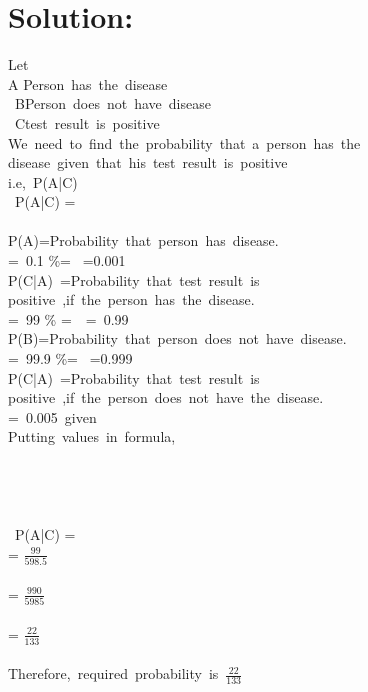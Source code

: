 \documentclass[journal,12pt,twocolumn]{IEEEtran}
\begin{document}
\section{Solution:}
Let\\
A \colon Person\ has\ the\ disease\\
\doublespacing \ B\colon Person\ does\ not\ have\ disease\\
\doubblespacing \ C\colon test\ result\ is\ positive\\
We\ need\ to\ find\ the\ probability\ 
that\ a\ person\ has\ the\\ disease\
given\ that\ his\ test\ result\ is\ positive\\
i.e,\ P(A|C)
\\
  \ P(A|C) = \\
  \\
  P(A)=Probability\ that\ person\
  has\ disease.\\
  =\ 0.1 \%= \ =0.001\\
P(C|A)\ =Probability\ that\ test\ result\ is\ \\
positive\ ,if\ the\ person\ has\ the\ disease.\ \\
\doubblespacing =\ 99 \% =\ \ =\ 0.99\\
  P(B)=Probability\ that\ person\
 does\ not\  have\ disease.\\
  =\ 99.9 \%= \frac{99.9}{100}\ =0.999\\
P(C|A)\ =Probability\ that\ test\ result\ is\ \\
positive\ ,if\ the\ person\ does\ not\ have\ the\ disease.\ \\
\doubblespacing =\ 0.005\ given\\
Putting\ values\ in\ formula,\ \\
 \\
 \\
 \\
 \\
  \ P(A|C) = \\

= $\frac{99}{598.5}$\\
\\
= $\frac{990}{5985}$\\
\\
= $\frac{22}{133}$\\
\\
Therefore,\ required\ probability\ is\  $\frac{22}{133}$\\
\end{document}
